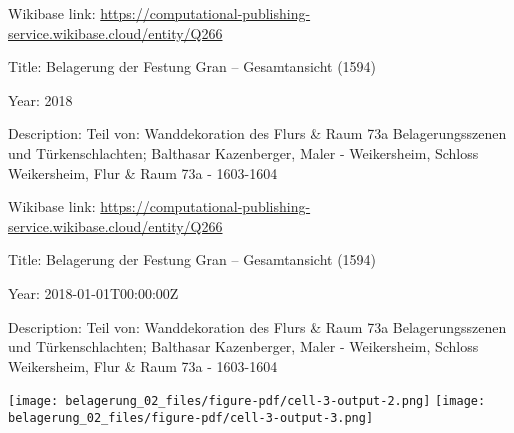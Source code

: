 \documentclass[
  letterpaper,
]{book}
\begin{document}
Wikibase link:
\url{https://computational-publishing-service.wikibase.cloud/entity/Q266}

Title: Belagerung der Festung Gran -- Gesamtansicht (1594)

Year: 2018

Description: Teil von: Wanddekoration des Flurs \& Raum 73a
Belagerungsszenen und Türkenschlachten; Balthasar Kazenberger, Maler -
Weikersheim, Schloss Weikersheim, Flur \& Raum 73a - 1603-1604

Wikibase link:
\url{https://computational-publishing-service.wikibase.cloud/entity/Q266}

Title: Belagerung der Festung Gran -- Gesamtansicht (1594)

Year: 2018-01-01T00:00:00Z

Description: Teil von: Wanddekoration des Flurs \& Raum 73a
Belagerungsszenen und Türkenschlachten; Balthasar Kazenberger, Maler -
Weikersheim, Schloss Weikersheim, Flur \& Raum 73a - 1603-1604

\texttt{[image: belagerung\_02\_files/figure-pdf/cell-3-output-2.png]}
\texttt{[image: belagerung\_02\_files/figure-pdf/cell-3-output-3.png]}


\chapter{}\label{section}


\chapter{}\label{section-1}


\chapter{}\label{section-2}


\chapter{}\label{section-3}


\chapter{}\label{section-4}
\end{document}
